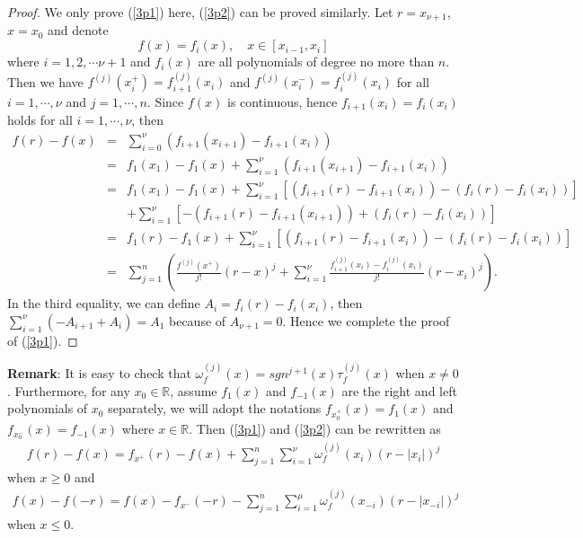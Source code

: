 \documentclass{article}
\begin{document}
\begin{proof}
We only prove (\ref{3p1}) here, (\ref{3p2}) can be proved similarly. Let $r=x_{\nu+1}$, $x=x_{0}$ and denote
\begin{equation*}
    f(x)=f_{i}(x), \quad x\in [x_{i-1}, x_{i}]
\end{equation*}
where $i=1, 2, \cdots \nu+1$ and $f_{i}(x)$ are all polynomials of degree no more than $n$. Then we have $f^{(j)}(x_{i}^{+})=f_{i+1}^{(j)}(x_{i})$ and $f^{(j)}(x_{i}^{-})=f_{i}^{(j)}(x_{i})$ for all $i=1, \cdots, \nu$ and $j=1, \cdots, n$. Since $f(x)$ is continuous, hence $f_{i+1}(x_{i})=f_{i}(x_{i})$ holds for all $i=1, \cdots, \nu$, then
\begin{eqnarray}\label{3a1}
    f(r)-f(x)&=&\sum_{i=0}^{\nu}\left(f_{i+1}(x_{i+1})-f_{i+1}(x_{i})\right)\nonumber\\
    &=&f_{1}(x_{1})-f_{1}(x)+\sum_{i=1}^{\nu}\left(f_{i+1}(x_{i+1})-f_{i+1}(x_{i})\right)\nonumber\\
    &=&f_{1}(x_{1})-f_{1}(x)+\sum_{i=1}^{\nu}[(f_{i+1}(r)-f_{i+1}(x_{i}))-(f_{i}(r)-f_{i}(x_{i}))]\nonumber\\
    &&+\sum_{i=1}^{\nu}[-(f_{i+1}(r)-f_{i+1}(x_{i+1}))+(f_{i}(r)-f_{i}(x_{i}))]\nonumber\\
    &=&f_{1}(r)-f_{1}(x)+\sum_{i=1}^{\nu}[(f_{i+1}(r)-f_{i+1}(x_{i}))-(f_{i}(r)-f_{i}(x_{i}))]\nonumber\\
    &=&\sum_{j=1}^{n}\left(\frac{f^{(j)}(x^{+})}{j!}(r-x)^{j}+\sum_{i=1}^{\nu}\frac{f_{i+1}^{(j)}(x_{i})-f_{i}^{(j)}(x_{i})}{j!}(r-x_{i})^{j}\right).\nonumber
\end{eqnarray}
In the third equality, we can define $A_{i}=f_{i}(r)-f_{i}(x_{i})$, then $\sum_{i=1}^{\nu}(-A_{i+1}+A_{i})=A_{1}$ because of $A_{\nu+1}=0$. Hence we complete the proof of (\ref{3p1}).
\end{proof}

\noindent\textbf{Remark}: It is easy to check that $\omega_{f}^{(j)}(x)=sgn^{j+1}(x)\tau_{f}^{(j)}(x)$ when $x\neq 0$. Furthermore, for any $x_{0}\in\mathbb{R}$, assume $f_{1}(x)$ and $f_{-1}(x)$ are the right and left polynomials of $x_{0}$ separately, we will adopt the notations $f_{x_{0}^{+}}(x)=f_{1}(x)$ and $f_{x_{0}^{-}}(x)=f_{-1}(x)$ where $x\in \mathbb{R}$. Then (\ref{3p1}) and (\ref{3p2}) can be rewritten as
\begin{eqnarray}\label{3p3}
    f(r)-f(x)=f_{x^{+}}(r)-f(x)+\sum_{j=1}^{n}\sum_{i=1}^{\nu}\omega_{f}^{(j)}(x_{i})(r-|x_{i}|)^{j}
\end{eqnarray}
when $x\geq 0$ and
\begin{eqnarray}\label{3p4}
    f(x)-f(-r)=f(x)-f_{x^{-}}(-r)-\sum_{j=1}^{n}\sum_{i=1}^{\mu}\omega_{f}^{(j)}(x_{-i})(r-|x_{-i}|)^{j}
\end{eqnarray}
when $x\leq 0$.
\end{document}
